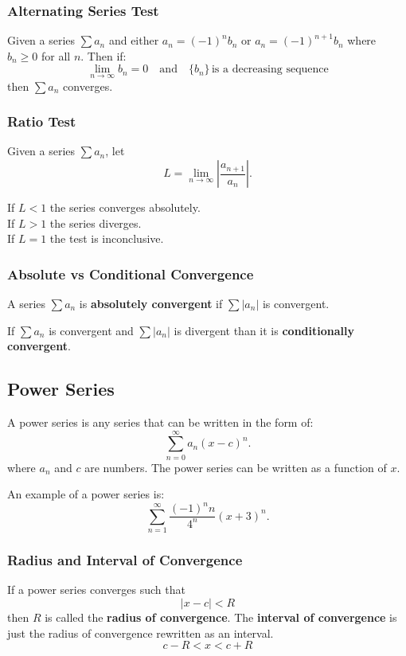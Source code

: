 \documentclass[12pt]{article}
\begin{document}
            \subsubsection{Alternating Series Test}
                Given a series $\displaystyle \sum a_n$ and either $a_n = (-1)^n b_n$ or $a_n = (-1)^{n+1} b_n$ where $b_n \ge 0$ for all $n$. Then if:
                \[ \lim_{n \to \infty} b_n = 0 \quad \text{and} \quad \{b_n\} \, \text{is a decreasing sequence} \]
                then $\displaystyle \sum a_n$ converges.

            \subsubsection{Ratio Test}
                \noindent Given a series $\displaystyle \sum a_n$, let
                \[ L = \lim_{n \to \infty} \left| \frac{a_{n+1}}{a_n} \right|. \]

                \noindent If $L < 1$ the series converges absolutely.
                \\ If $L > 1$ the series diverges.
                \\ If $L = 1$ the test is inconclusive.

            \subsubsection{Absolute vs Conditional Convergence}
                \noindent A series $\displaystyle \sum a_n$ is \textbf{absolutely convergent} if $\displaystyle \sum |a_n|$ is convergent.

                \noindent If $\displaystyle \sum a_n$ is convergent and $\displaystyle \sum |a_n|$ is divergent than it is \textbf{conditionally convergent}.

        \subsection{Power Series}
            A power series is any series that can be written in the form of:
            \[ \sum_{n=0}^\infty a_n (x-c)^n. \]
            where $a_n$ and $c$ are numbers. The power series can be written as a function of $x$.

            \noindent An example of a power series is:
            \[ \sum_{n=1}^\infty \frac{(-1)^n n}{4^n} (x+3)^n. \]

            \subsubsection{Radius and Interval of Convergence}
                \noindent If a power series converges such that
                \[ |x-c| < R \]
                then $R$ is called the \textbf{radius of convergence}. The \textbf{interval of convergence} is just the radius of convergence rewritten as an interval.
                \[ c - R < x < c + R \]
\end{document}
